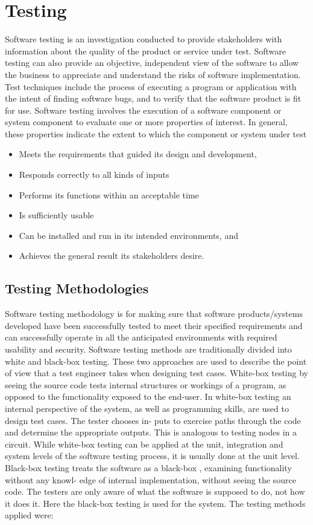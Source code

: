 \documentclass[11pt]{report}
\begin{document}
\chapter{Testing}
Software testing is an investigation conducted to provide stakeholders with information about
the quality of the product or service under test. Software testing can also provide an objective,
independent view of the software to allow the business to appreciate and understand the risks of
software implementation. Test techniques include the process of executing a program or application
with the intent of finding software bugs, and to verify that the software product is fit for use.
Software testing involves the execution of a software component or system component to evaluate
one or more properties of interest. In general, these properties indicate the extent to which the
component or system under test
\begin{itemize}
    \item Meets the requirements that guided its design and development,
    \item Responds correctly to all kinds of inputs
    \item Performs its functions within an acceptable time
\item Is sufficiently usable
\item Can be installed and run in its intended environments, and
\item Achieves the general result its stakeholders desire.
\end{itemize}
\section{Testing Methodologies}
Software testing methodology is for making sure that software products/systems developed have
been successfully tested to meet their specified requirements and can successfully operate in all the
anticipated environments with required usability and security.
Software testing methods are traditionally divided into white and black-box testing. These two
approaches are used to describe the point of view that a test engineer takes when designing test
cases.
White-box testing by seeing the source code tests internal structures or workings of a program, as
opposed to the functionality exposed to the end-user. In white-box testing an internal perspective
of the system, as well as programming skills, are used to design test cases. The tester chooses in-
puts to exercise paths through the code and determine the appropriate outputs. This is analogous
to testing nodes in a circuit. While white-box testing can be applied at the unit, integration and system levels of the software testing process, it is usually done at the unit level.
Black-box testing treats the software as a black-box , examining functionality without any knowl-
edge of internal implementation, without seeing the source code. The testers are only aware of
what the software is supposed to do, not how it does it. Here the black-box testing is used for the
system. The testing methods applied were:
\end{document}

